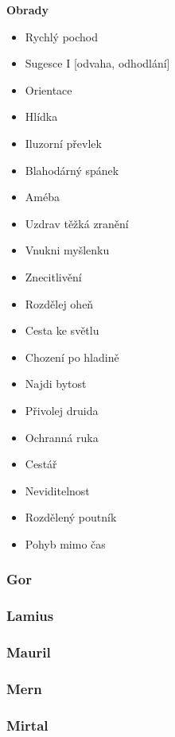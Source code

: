 \textbf{Obrady}
\begin{itemize}

    \item Rychlý pochod
    \item Sugesce I [odvaha, odhodlání]
    \item Orientace
    \item Hlídka
    \item Iluzorní převlek
    \item Blahodárný spánek
    \item Améba
\item Uzdrav těžká zranění
\item Vnukni myšlenku
\item Znecitlivění
\item Rozdělej oheň
\item Cesta ke světlu
\item Chození po hladině
\item Najdi bytost
\item Přivolej druida
\item Ochranná ruka 
\item Cestář
\item Neviditelnost
    \item Rozdělený poutník
    \item Pohyb mimo čas
\end{itemize}

\subsubsection{Gor}
\label{sec:gor}

\subsubsection{Lamius}
\label{sec:lamius}

\subsubsection{Mauril}
\label{sec:mauril}

\subsubsection{Mern}
\label{sec:mern}

\subsubsection{Mirtal}
\label{sec:mirtal}

